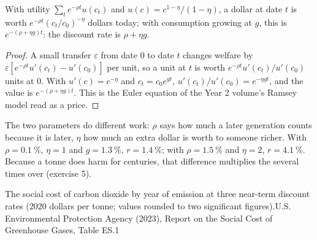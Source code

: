 \begin{proposition}\label{prop:b3:environmental-and-resource-economics:ramsey}
With utility $\sum_t e^{-\rho t} u(c_t)$ and $u(c) = c^{1 - \eta}/(1 - \eta)$, a dollar at date $t$ is worth $e^{-\rho t}(c_t/c_0)^{-\eta}$ dollars today; with consumption growing at $g$,
this is $e^{-(\rho + \eta g)t}$: the discount rate is $\rho + \eta g$.
\end{proposition}

\begin{proof}
A small transfer $\varepsilon$ from date 0 to date $t$ changes welfare by $\varepsilon[e^{-\rho t}u'(c_t) - u'(c_0)]$ per unit, so a unit at $t$ is worth $e^{-\rho t}u'(c_t)/u'(c_0)$ units at 0.
With $u'(c) = c^{-\eta}$ and $c_t = c_0e^{gt}$, $u'(c_t)/u'(c_0) = e^{-\eta gt}$, and the value is $e^{-(\rho + \eta g)t}$. This is the Euler equation of the Year 2
volume's Ramsey model read as a price.
\end{proof}

The two parameters do different work: $\rho$ says how much a later generation counts
because it is later, $\eta$ how much an extra dollar is worth to someone richer. With $\rho = 0.1~\%$, $\eta = 1$ and
$g = 1.3~\%$, $r = 1.4~\%$; with $\rho = 1.5~\%$ and $\eta = 2$, $r = 4.1~\%$. Because a tonne does harm for centuries, that difference multiplies
the  several times over (exercise 5).

\begin{omchart}{The social cost of carbon dioxide by year of emission at three near-term
discount rates (2020 dollars per tonne; values rounded to two significant
figures).}{U.S. Environmental Protection Agency (2023), Report on the Social Cost of
Greenhouse Gases, Table ES.1}
\end{omchart}

